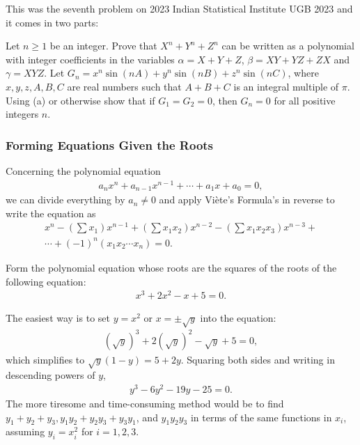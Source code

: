 \documentclass[12pt,a4paper]{memoir}
\theoremstyle{definition}
\begin{document}
\begin{question}
	This was the seventh problem on 2023 Indian Statistical Institute UGB 2023 and it comes in two parts:
	\begin{tasks}
		\task Let $n \geq 1$ be an integer. Prove that $X^n+Y^n+Z^n$ can be written as a polynomial with integer coefficients in the variables $\alpha=X+Y+Z$, $\beta= XY+YZ+ZX$ and $\gamma = XYZ$.
		\task Let $G_n=x^n \sin(nA)+y^n \sin(nB)+z^n \sin(nC)$, where $x,y,z, A,B,C$ are real numbers such that $A+B+C$ is an integral multiple of $\pi$. Using (a) or otherwise show that if $G_1=G_2=0$, then $G_n=0$ for all positive integers $n$.
	\end{tasks}
\end{question}




\subsubsection{Forming Equations Given the Roots}

\begin{tcolorbox}[title={Forming Equations A.K.A. Reverse Viète}]
	\begin{question}
		Concerning the polynomial equation
		\begin{align*}
			a_nx^n+a_{n-1}x^{n-1} + \cdots + a_1x + a_0 = 0,
		\end{align*}
		we can divide everything by $a_n\neq 0$ and apply Viète's Formula's in reverse to write the equation as
		\begin{multline*}
			x^n - \left(\sum x_1\right) x^{n-1} + \left(\sum x_1x_2\right) x^{n-2} - \left(\sum x_1x_2x_3\right)x^{n-3} +\\ \cdots + (-1)^n (x_1x_2\cdots x_n)=0.
		\end{multline*}
	\end{question}
\end{tcolorbox}

\begin{question}
	Form the polynomial equation whose roots are the squares of the roots of the following equation:
	\begin{align*}
		x^3+2x^2-x+5=0.
	\end{align*}
\end{question}

\begin{solution}
	The easiest way is to set $y=x^2$ or $x=\pm \sqrt{y}$ into the equation:
	\begin{align*}
		(\sqrt{y})^3+2(\sqrt{y})^2-\sqrt{y}+5=0,
	\end{align*}
	which simplifies to $\sqrt{y}(1-y) = 5+2y$. Squaring both sides and writing in descending powers of $y$,
	\begin{align*}
		y^3-6y^2-19y-25=0.
	\end{align*}
	The more tiresome and time-consuming method would be to find $y_1+y_2+y_3, y_1y_2+y_2y_3+y_3y_1$, and $y_1y_2y_3$ in terms of the same functions in $x_i$, assuming $y_i=x_i^2$ for $i=1,2,3$. 
\end{solution}
\end{document}
